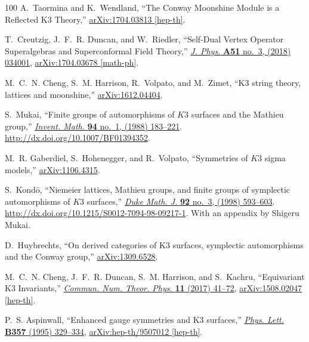\documentclass[11pt,a4paper,fontset=windows]{ctexart}
\numberwithin{equation}{section}
\begin{document}
\begin{thebibliography}{100}
A.~Taormina and K.~Wendland, ``{The Conway Moonshine Module is a Reflected K3
  Theory},''
\href{http://arxiv.org/abs/1704.03813}{{\ttfamily arXiv:1704.03813 [hep-th]}}.

T.~Creutzig, J.~F.~R. Duncan, and W.~Riedler, ``{Self-Dual Vertex Operator
  Superalgebras and Superconformal Field Theory},''
  \href{http://dx.doi.org/10.1088/1751-8121/aa9af5}{{\em J. Phys.} {\bfseries
  A51} no.~3, (2018) 034001},
\href{http://arxiv.org/abs/1704.03678}{{\ttfamily arXiv:1704.03678 [math-ph]}}.

M.~C.~N. Cheng, S.~M. Harrison, R.~Volpato, and M.~Zimet, ``K3 string theory,
  lattices and moonshine,''
  \href{http://arxiv.org/abs/arXiv:1612.04404}{{\ttfamily arXiv:1612.04404}}.

S.~Mukai, ``Finite groups of automorphisms of {$K3$} surfaces and the {M}athieu
  group,'' \href{http://dx.doi.org/10.1007/BF01394352}{{\em Invent. Math.}
  {\bfseries 94} no.~1, (1988) 183--221}.
  \url{http://dx.doi.org/10.1007/BF01394352}.

M.~R. Gaberdiel, S.~Hohenegger, and R.~Volpato, ``{Symmetries of $K3$ sigma
  models},'' \href{http://arxiv.org/abs/arXiv:1106.4315}{{\ttfamily
  arXiv:1106.4315}}.

S.~Kond{\=o}, ``Niemeier lattices, {M}athieu groups, and finite groups of
  symplectic automorphisms of {$K3$} surfaces,''
  \href{http://dx.doi.org/10.1215/S0012-7094-98-09217-1}{{\em Duke Math. J.}
  {\bfseries 92} no.~3, (1998) 593--603}.
  \url{http://dx.doi.org/10.1215/S0012-7094-98-09217-1}. With an appendix by
  Shigeru Mukai.

D.~Huybrechts, ``On derived categories of {K}3 surfaces, symplectic
  automorphisms and the {C}onway group,''
  \href{http://arxiv.org/abs/arXiv:1309.6528}{{\ttfamily arXiv:1309.6528}}.

M.~C.~N. Cheng, J.~F.~R. Duncan, S.~M. Harrison, and S.~Kachru, ``{Equivariant
  K3 Invariants},'' \href{http://dx.doi.org/10.4310/CNTP.2017.v11.n1.a2}{{\em
  Commun. Num. Theor. Phys.} {\bfseries 11} (2017) 41--72},
\href{http://arxiv.org/abs/1508.02047}{{\ttfamily arXiv:1508.02047 [hep-th]}}.

P.~S. Aspinwall, ``{Enhanced gauge symmetries and K3 surfaces},''
  \href{http://dx.doi.org/10.1016/0370-2693(95)00957-M}{{\em Phys. Lett.}
  {\bfseries B357} (1995) 329--334},
\href{http://arxiv.org/abs/hep-th/9507012}{{\ttfamily arXiv:hep-th/9507012
  [hep-th]}}.


\end{thebibliography}
\end{document}
